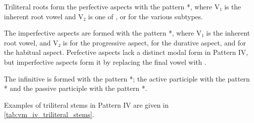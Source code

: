 \documentclass[grammar]{subfiles}
\begin{document}
Triliteral roots form the perfective aspects with the pattern *,
where V₁ is the inherent root vowel and V₂ is one of ,  or 
for the various subtypes.  

The imperfective aspects are formed with the pattern *,
where V₁ is the inherent root vowel, and V₂ is  for the progressive
aspect,  for the durative aspect, and  for the habitual aspect.
Perfective aspects lack a distinct modal form in Pattern IV, but imperfective
aspects form it by replacing the final vowel with . 

The infinitive is formed with the pattern *; the active participle
with the pattern * and the passive participle with the pattern
*. 

Examples of triliteral stems in Pattern IV are given in \cref{tab:vm_iv_triliteral_stems}. 

\begin{table}[h!]\small\capstart
  \centering
  \\
  \caption{Pattern IV triliteral stems \label{tab:vm_iv_triliteral_stems}}
\end{table}
\end{document}

